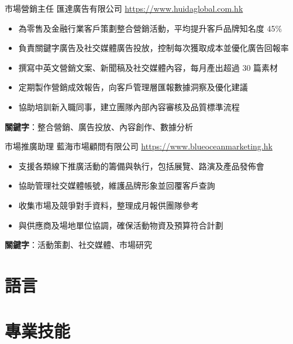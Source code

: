 \documentclass[a4paper, serif, 10pt]{moderncv}
\begin{document}
        {市場營銷主任}
        {匯達廣告有限公司}
        {\url{https://www.huidaglobal.com.hk}}
        {}
        {\begin{itemize}
\item 為零售及金融行業客戶策劃整合營銷活動，平均提升客戶品牌知名度 45\%
\item 負責關鍵字廣告及社交媒體廣告投放，控制每次獲取成本並優化廣告回報率
\item 撰寫中英文營銷文案、新聞稿及社交媒體內容，每月產出超過 30 篇素材
\item 定期製作營銷成效報告，向客戶管理層匯報數據洞察及優化建議
\item 協助培訓新入職同事，建立團隊內部內容審核及品質標準流程
\end{itemize}
\textbf{關鍵字}：整合營銷、廣告投放、內容創作、數據分析}

        {市場推廣助理}
        {藍海市場顧問有限公司}
        {\url{https://www.blueoceanmarketing.hk}}
        {}
        {\begin{itemize}
\item 支援各類線下推廣活動的籌備與執行，包括展覽、路演及產品發佈會
\item 協助管理社交媒體帳號，維護品牌形象並回覆客戶查詢
\item 收集市場及競爭對手資料，整理成月報供團隊參考
\item 與供應商及場地單位協調，確保活動物資及預算符合計劃
\end{itemize}
\textbf{關鍵字}：活動策劃、社交媒體、市場研究}
\section{語言}

\section{專業技能}

\end{document}
